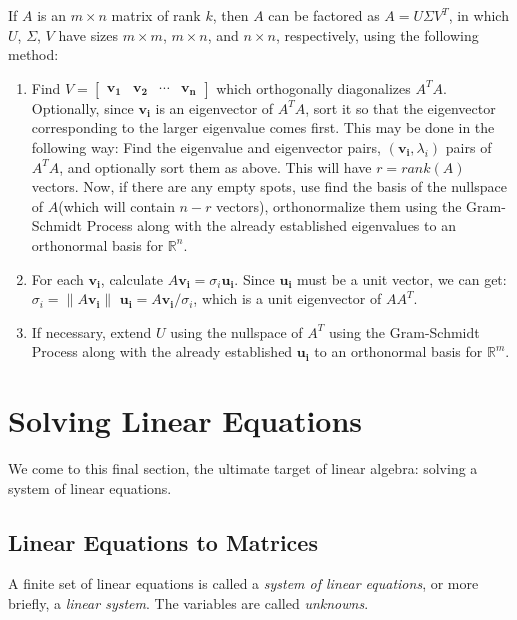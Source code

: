 \documentclass{report}
\begin{document}
		\begin{mthd}
			If $A$ is an $m \times n$ matrix of rank $k$, then $A$ can be factored as $A=U \Sigma V^T$, in which $U$, $\Sigma$, $V$ have sizes $m \times m$, $m \times n$, and $n \times n$, respectively, using the following method:
			\begin{enumerate}
				\item Find $V=\begin{bmatrix} \bm{v_1} & \bm{v_2} & \cdots & \bm{v_n} \end{bmatrix}$ which orthogonally diagonalizes $A^TA$. Optionally, since $\bm{v_i}$ is an eigenvector of $A^TA$, sort it so that the eigenvector corresponding to the larger eigenvalue comes first.
					\subitem This may be done in the following way: Find the eigenvalue and eigenvector pairs, $(\bm{v_i}, \lambda_i)$ pairs of $A^TA$, and optionally sort them as above. This will have $r=rank(A)$ vectors. Now, if there are any empty spots, use find the basis of the nullspace of $A$(which will contain $n-r$ vectors), orthonormalize them using the Gram-Schmidt Process along with the already established eigenvalues to an orthonormal basis for $\mathbb{R}^n$.
				\item For each $\bm{v_i}$, calculate $A\bm{v_i}=\sigma_i\bm{u_i}$. Since $\bm{u_i}$ must be a unit vector, we can get:
					\subitem $\sigma_i=\|A\bm{v_i}\|$
					\subitem $\bm{u_i}=A\bm{v_i}/\sigma_i$, which is a unit eigenvector of $AA^T$.
				\item If necessary, extend $U$ using the nullspace of $A^T$ using the Gram-Schmidt Process along with the already established $\bm{u_i}$ to an orthonormal basis for $\mathbb{R}^m$.
			\end{enumerate}
		\end{mthd}
	
	\section{Solving Linear Equations}
	We come to this final section, the ultimate target of linear algebra: solving a system of linear equations.
		\subsection{Linear Equations to Matrices}
		A finite set of linear equations is called a \emph{system of linear equations}, or more briefly, a \emph{linear system}. The variables are called \emph{unknowns}.
		
\end{document}
